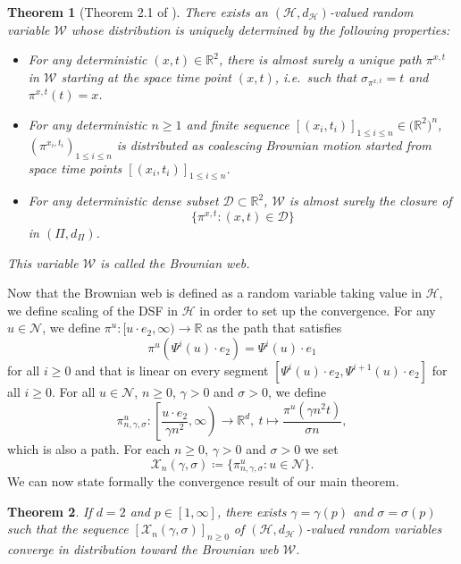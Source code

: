\documentclass[a4paper, 11pt]{article}
\theoremstyle{plain}
\newtheorem{Theorem}{Theorem}[section]
\theoremstyle{definition}
\newcommand{\R}{\mathbb{R}}
\numberwithin{equation}{section}
\begin{document}
\begin{Theorem}[Theorem 2.1 of \cite{BrownianWeb}]
    There exists an $(\mathcal H,d_\mathcal H)$-valued random variable $\mathcal W$ whose distribution is uniquely determined by the following properties:
        \begin{itemize}
            \item For any deterministic $(x,t)\in\R^2$, there is almost surely a unique path $\pi^{x,t}$ in $\mathcal W$ starting at the space time point $(x,t)$, i.e.\ such that $\sigma_{\pi^{x,t}}=t$ and $\pi^{x,t}(t)=x$.
            \item For any deterministic $n\geq1$ and finite sequence $[(x_i, t_i)]_{1\leq i\leq n}\in\mathcal(\R^2)^n$, $(\pi^{x_i, t_i})_{1\leq i\leq n}$ is distributed as coalescing Brownian motion started from space time points $[(x_i, t_i)]_{1\leq i\leq n}$.
            \item For any deterministic dense subset $\mathcal D\subset\R^2$, $\mathcal W$ is almost surely the closure of 
                \[\{\pi^{x, t}:(x, t)\in\mathcal D\}\]
            in $(\Pi,d_\Pi)$.
        \end{itemize}
    This variable $\mathcal W$ is called the Brownian web.
\end{Theorem}


Now that the Brownian web is defined as a random variable taking value in $\mathcal H$, we define scaling of the DSF in $\mathcal H$ in order to set up the convergence. For any $u\in\mathcal N$, we define $\pi^u:[u\cdot e_2,\infty)\to\R$ as the path that satisfies
    \[\pi^u(\Psi^{ i}(u)\cdot e_2)=\Psi^{ i}(u)\cdot e_1\]
for all $i\geq 0$ and that is linear on every segment $[\Psi^{ i}(u)\cdot e_2, \Psi^{ {i+1}}(u)\cdot e_2]$ for all $i\geq0$. For all $u\in\mathcal N$, $n\geq 0$, $\gamma>0$ and $\sigma>0$, we define
    \[\pi^u_{n,\gamma,\sigma}:\left[\frac{u\cdot e_2}{\gamma n^2},\infty\right)\to\R^d,~t\mapsto \frac{\pi^u(\gamma n^2t)}{\sigma n},\]
which is also a path. For each $n\geq 0$, $\gamma>0$ and $\sigma>0$ we set
    \[\mathcal X_n(\gamma,\sigma)\coloneqq\{\pi^u_{n,\gamma,\sigma}:u\in\mathcal N\}.\]
We can now state formally the convergence result of our main theorem.


\begin{Theorem}
    \label{thm_convergence_BW}
    If $d=2$ and $p\in[1, \infty]$, there exists $\gamma=\gamma(p)$ and $\sigma=\sigma(p)$ such that the sequence $[\mathcal X_n(\gamma, \sigma)]_{n\geq 0}$ of $(\mathcal H, d_{\mathcal H})$-valued random variables converge in distribution toward the Brownian web $\mathcal W$.
\end{Theorem}
\end{document}
